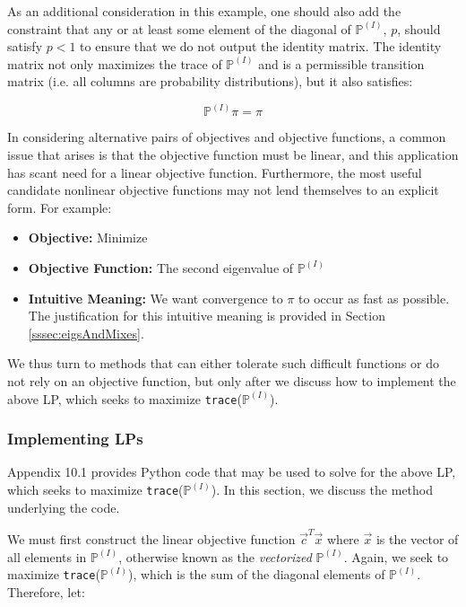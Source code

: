 \documentclass{article}
\begin{document}
As an additional consideration in this example, one should also add the constraint that any or at least some element of the diagonal of $\mathbb{P}^{(I)}$, $p$, should satisfy $p < 1$ to ensure that we do not output the identity matrix. The identity matrix not only maximizes the trace of $\mathbb{P}^{(I)}$ and is a permissible transition matrix (i.e. all columns are probability distributions), but it also satisfies:

\[
\mathbb{P}^{(I)} \pi = \pi
\]

In considering alternative pairs of objectives and objective functions, a common issue that arises is that the objective function must be linear, and this application has scant need for a linear objective function. Furthermore, the most useful candidate nonlinear objective functions may not lend themselves to an explicit form. For example:

\begin{itemize}
  \item[] \textbf{Objective:} Minimize
  \item[] \textbf{Objective Function:} The second eigenvalue of $\mathbb{P}^{(I)}$
  \item[] \textbf{Intuitive Meaning:} We want convergence to $\pi$ to occur as fast as possible. The justification for this intuitive meaning is provided in Section \ref{sssec:eigsAndMixes}.
\end{itemize}

We thus turn to methods that can either tolerate such difficult functions or do not rely on an objective function, but only after we discuss how to implement the above LP, which seeks to maximize \texttt{trace}($\mathbb{P}^{(I)}$).

\subsubsection{Implementing LPs}
Appendix 10.1 provides Python code that may be used to solve for the above LP, which seeks to maximize \texttt{trace}($\mathbb{P}^{(I)}$). In this section, we discuss the method underlying the code.

We must first construct the linear objective function $\vec{c}^T\vec{x}$ where $\vec{x}$ is the vector of all elements in $\mathbb{P}^{(I)}$, otherwise known as the \textit{vectorized} $\mathbb{P}^{(I)}$. Again, we seek to maximize \texttt{trace}($\mathbb{P}^{(I)}$), which is the sum of the diagonal elements of $\mathbb{P}^{(I)}$. Therefore, let:
\end{document}
